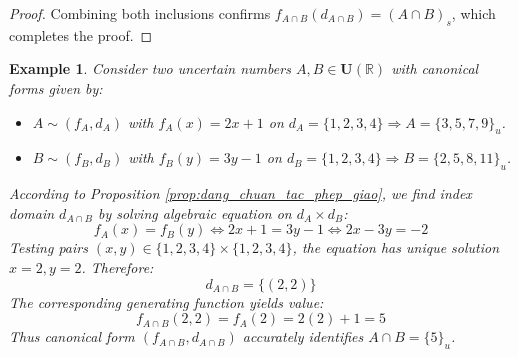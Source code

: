 \documentclass[a4paper,12pt, twoside]{memoir}
\newtheorem{example}{Example}[chapter]
\begin{document}
\begin{proof}
	Combining both inclusions confirms $f_{A \cap B}(d_{A \cap B}) = (A \cap B)_s$, which completes the proof.
\end{proof}
\begin{example}
	Consider two uncertain numbers $A, B \in \mathbf{U}(\mathbb{R})$ with canonical forms given by:
	\begin{itemize}[leftmargin=*]
		\item $A \sim (f_A, d_A)$ with $f_A(x) = 2x + 1$ on $d_A = \{1, 2, 3, 4\} \Rightarrow A = \{3, 5, 7, 9\}_u$.
		\item $B \sim (f_B, d_B)$ with $f_B(y) = 3y - 1$ on $d_B = \{1, 2, 3, 4\} \Rightarrow B = \{2, 5, 8, 11\}_u$.
	\end{itemize}

	According to Proposition \ref{prop:dang_chuan_tac_phep_giao}, we find index domain $d_{A \cap B}$ by solving algebraic equation on $d_A \times d_B$:
	\[
		f_A(x) = f_B(y) \iff 2x + 1 = 3y - 1 \iff 2x - 3y = -2
	\]
	Testing pairs $(x, y) \in \{1, 2, 3, 4\} \times \{1, 2, 3, 4\}$, the equation has unique solution $x = 2, y = 2$. Therefore:
	\[
		d_{A \cap B} = \{(2, 2)\}
	\]
	The corresponding generating function yields value:
	\[
		f_{A \cap B}(2, 2) = f_A(2) = 2(2) + 1 = 5
	\]
	Thus canonical form $(f_{A \cap B}, d_{A \cap B})$ accurately identifies $A \cap B = \{5\}_u$.
\end{example}
\end{document}
